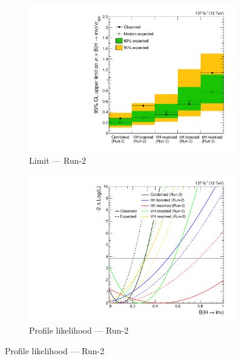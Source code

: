 \begin{figure}[htbp]
    \centering
    \begin{subfigure}[t]{0.45\textwidth}  %
        \includegraphics[width=\textwidth]{chapters/higgstoinv/figures/limits/full_Run2/limit_Run2_ttH_VH_resolved_boosted.pdf}
        \caption{Limit --- Run-2}
    \end{subfigure}
    \hspace{0.05\textwidth}
    \begin{subfigure}[t]{0.45\textwidth}
        \includegraphics[width=\textwidth]{chapters/higgstoinv/figures/likelihood_scan/profile_likelihood_scan_Run2_ttH_VH_resolved_boosted.pdf}
        \caption{Profile likelihood --- Run-2}
    \end{subfigure}

\end{figure}
